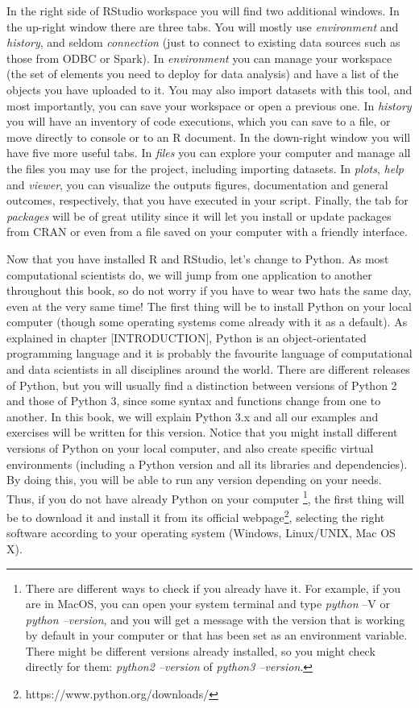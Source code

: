 In the right side of RStudio workspace you will find two additional windows. In the up-right window there are three tabs. You will mostly use \textit{environment} and \textit{history}, and seldom \textit{connection} (just to connect to existing data sources such as those from ODBC or Spark). In \textit{environment} you can manage your workspace (the set of elements you need to deploy for data analysis) and have a list of the objects you have uploaded to it. You may also import datasets with this tool, and most importantly, you can save your workspace or open a previous one. In \textit{history} you will have an inventory of code executions, which you can save to a file, or move directly to console or to an R document. In the down-right window you will have five more useful tabs. In \textit{files} you can explore your computer and manage all the files you may use for the project, including importing datasets. In \textit{plots}, \textit{help} and \textit{viewer}, you can visualize the outputs figures, documentation and general outcomes, respectively, that you have executed in your script. Finally, the tab for \textit{packages} will be of great utility since it will let you install or update packages from CRAN or even from a file saved on your computer with a friendly interface.

Now that you have installed R and RStudio, let's change to Python. As most computational scientists do, we will jump from one application to another throughout this book, so do not worry if you have to wear two hats the same day, even at the very same time! The first thing will be to install Python on your local computer (though some operating systems come already with it as a default). As explained in chapter [INTRODUCTION], Python is an object-orientated programming language and it is probably the favourite language of computational and data scientists in all disciplines around the world. There are different releases of Python, but you will usually find a distinction between versions of Python 2 and those of Python 3, since some syntax and functions change from one to another. In this book, we will explain Python 3.x and all our examples and exercises will be written for this version. Notice that you might install different versions of Python on your local computer, and also create specific virtual environments (including a Python version and all its libraries and dependencies).  By doing this, you will be able to run any version depending on your needs. Thus, if you do not have already Python on your computer	\footnote{There are different ways to check if you already have it. For example, if you are in MacOS, you can open your system terminal and type \textit{python} –V or \textit{python --version}, and you will get a message with the version that is working by default in your computer or that has been set as an environment variable. There might be different versions already installed, so you might check directly for them: \textit{python2 --version} of \textit{python3 --version}.}, the first thing will be to download it and install it from its official webpage\footnote{https://www.python.org/downloads/}, selecting the right software according to your operating system (Windows, Linux/UNIX, Mac OS X).

